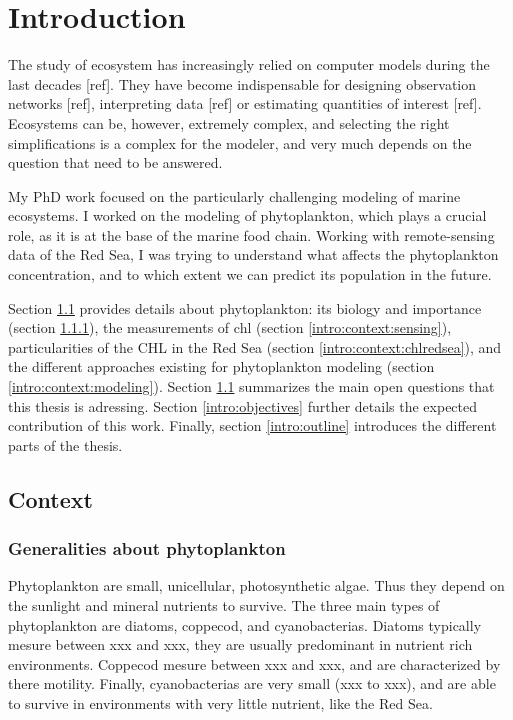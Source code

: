 

\chapter{Introduction}
\label{intro}


The study of ecosystem has increasingly relied on computer models during the last decades [ref]. They have become indispensable for designing observation networks [ref], interpreting data [ref] or estimating quantities of interest [ref]. Ecosystems can be, however, extremely complex, and selecting the right simplifications is a complex for the modeler, and very much depends on the question that need to be answered. 

My PhD work focused on the particularly challenging modeling of marine ecosystems. I worked on the modeling of phytoplankton, which plays a crucial role, as it is at the base of the marine food chain. Working with remote-sensing data of the Red Sea, I was trying to understand what affects the phytoplankton concentration, and to which extent we can predict its population in the future. 

Section \ref{intro:context} provides details about phytoplankton: its biology and importance (section \ref{intro:context:generalities}), the measurements of chl (section \ref{intro:context:sensing}), particularities of the CHL in the Red Sea (section \ref{intro:context:chlredsea}), and the different approaches existing for phytoplankton modeling (section \ref{intro:context:modeling}). Section \ref{intro:context} summarizes the main open questions that this thesis is adressing. Section \ref{intro:objectives} further details the expected contribution of this work. Finally, section \ref{intro:outline} introduces the different parts of the thesis. 

\section{Context}
\label{intro:context}

	\subsection{Generalities about phytoplankton}
	\label{intro:context:generalities}

		Phytoplankton are small, unicellular, photosynthetic algae. Thus they depend on the sunlight and mineral nutrients to survive. The three main types of phytoplankton are diatoms, coppecod, and cyanobacterias. Diatoms typically mesure between xxx and xxx, they are usually predominant in nutrient rich environments. Coppecod mesure between xxx and xxx, and are characterized by there motility. Finally, cyanobacterias are very small (xxx to xxx), and are able to survive in environments with very little nutrient, like the Red Sea. 

